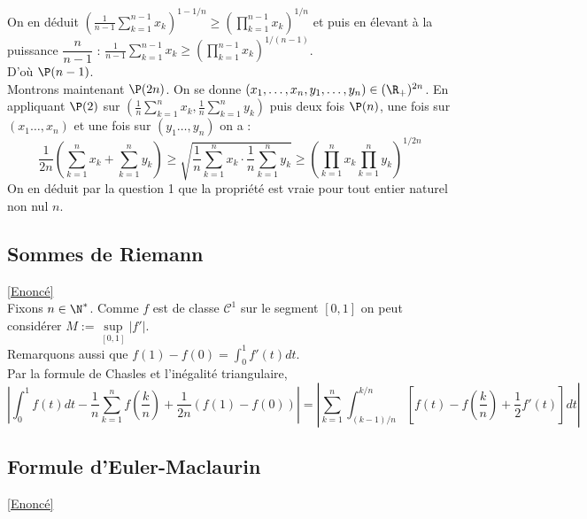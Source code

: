\documentclass{book}
\begin{document}
\begin{enumerate}[leftmargin=*]
		On en déduit $\displaystyle\left(\frac{1}{n-1}\sum_{k=1}^{n-1}x_k\right)^{1-1/n}\geq \left(\prod_{k=1}^{n-1}x_k\right)^{1/n}$ et puis en élevant à la puissance $\dfrac{n}{n-1}$ : $\displaystyle\frac{1}{n-1}\sum_{k=1}^{n-1}x_k\geq \left(\prod_{k=1}^{n-1}x_k\right)^{1/(n-1)}$.\\
		D'où $\P(n-1)$.\\
		Montrons maintenant $\P(2n)$. On se donne $(x_1,\dots,x_n,y_1,\dots,y_n)\in (\R_+)^{2n}$. En appliquant $\P(2)$ sur $\displaystyle\left(\frac{1}{n}\sum_{k=1}^nx_k,\frac{1}{n}\sum_{k=1}^ny_k\right)$ puis deux fois $\P(n)$, une fois sur $(x_1\dots,x_n)$ et une fois sur $(y_1\dots,y_n)$ on a :\\
		$$\frac{1}{2n}\left(\sum_{k=1}^nx_k+\sum_{k=1}^ny_k\right)\geq \sqrt{\frac{1}{n}\sum_{k=1}^nx_k\cdot\frac{1}{n}\sum_{k=1}^ny_k}\geq\left(\prod_{k=1}^nx_k\prod_{k=1}^ny_k\right)^{1/2n}$$
		On en déduit par la question 1 que la propriété est vraie pour tout entier naturel non nul $n$.
	\end{enumerate}
	
	\subsection{Sommes de Riemann}
	\label{sec:sommes-de-riemann}
	\textcolor{blue}{\hyperref[Sommes de Riemann]{[Enoncé]}}\\
	Fixons $n\in \N^*$. Comme $f$ est de classe $\mathcal C^1$ sur le segment $[0,1]$ on peut considérer $M:=\sup\limits_{[0,1]}|f'|$.\\
	Remarquons aussi que $f(1)-f(0)=\displaystyle\int_0^1f'(t)dt$.\\
	Par la formule de Chasles et l'inégalité triangulaire,
	$$\left|\int_0^1f(t)dt-\frac{1}{n}\sum_{k=1}^nf\left(\frac{k}{n}\right)+\frac{1}{2n}(f(1)-f(0))\right|=\left|\sum_{k=1}^n\int_{(k-1)/n}^{k/n}\left[f(t)-f\left(\frac{k}{n}\right)+\frac{1}{2}f'(t)\right]dt\right|$$
	
	\subsection{Formule d'Euler-Maclaurin}
	\label{sec:formule-deuler-maclaurin}
	\textcolor{blue}{\hyperref[Formule 
	d'Euler-Maclaurin]{[Enoncé]}}\\
	
\end{document}

